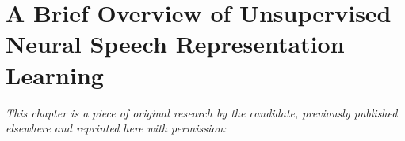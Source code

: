 
\chapter[a brief overview of unsupervised neural speech representation learning]{A Brief Overview of Unsupervised Neural Speech Representation Learning}
\label{chp:paper-brief}

\textit{This chapter is a piece of original research by the candidate, previously published elsewhere and reprinted here with permission:} \newline
\begin{center}
    \begin{enumerate}[leftmargin=8mm,rightmargin=8mm,topsep=0mm,label={[\Alph*]}]
        \setcounter{enumi}{2}
        \item {} \co \hspace{0.1em} \parencite{borgholt_brief_2022}
        \end{enumerate}
\end{center}


